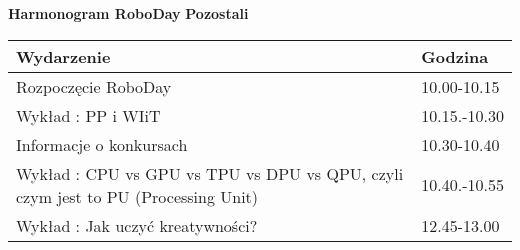 \documentclass{article}
\begin{document}
\begin{center}
\Large\textbf{Harmonogram RoboDay}
\large\textbf{Pozostali}
\end{center}
\vspace{1cm}
\begin{center}
\begin{tabular}{|l|l|}
\hline
\textbf{Wydarzenie} & \textbf{Godzina} \\
\hline
Rozpoczęcie RoboDay & 10.00-10.15 \\
\hline
Wykład : PP i WIiT & 10.15.-10.30 \\
\hline
Informacje o konkursach & 10.30-10.40 \\
\hline
Wykład : CPU vs GPU vs TPU vs DPU vs QPU, czyli czym jest to PU (Processing Unit) & 10.40.-10.55 \\
\hline
Wykład : Jak uczyć kreatywności? & 12.45-13.00 \\
\hline
\end{tabular}
\end{center}
\end{document}
